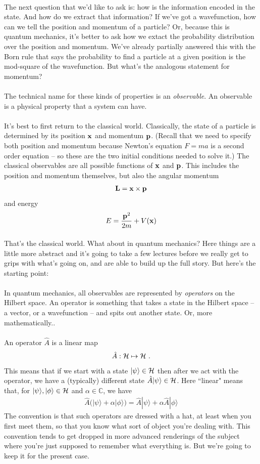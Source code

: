 \documentclass[12pt]{article}
\def\be{\begin{eqnarray}}
\def\ee{\end{eqnarray}}
\newcommand{\nn}{\nonumber}
\newcommand\para{\paragraph{}}
\newcommand{\ket}[1]{|#1\rangle}
\newcommand{\co}{\color{olive}}
\newcommand{\C}{{\mathds C}}
\newcommand{\bx}{{\bf x}}
\newcommand{\bp}{{\bf p}}
\begin{document}
{\para
The next question that we'd like to ask is: how is the information encoded in the state. And how do we extract that information? If we've got a wavefunction, how can we tell the position and momentum of a particle? Or, because this is quantum mechanics, it's better to ask how we extact the probability distribution over the position and momentum. We've already partially answered this with the Born rule that says the probability to find a particle at a given position is the mod-square of the wavefunction. But what's the analogous statement for momentum? 

\para
The technical name for these kinds of properties is an {\it observable}. An observable is a physical property that a system can have.

\para
It's best to first return to the classical world. {\co Classically, the state of a particle is determined by its position $\bx$ and momentum $\bp$.} (Recall that we need to specify both position and momentum because Newton's equation $F=ma$ is a second order equation -- so these are the two initial conditions needed to solve it.) {\co The classical observables are all possible functions of $\bx$ and $\bp$. This includes the position and momentum themselves, but also the angular momentum
%
\be {\bf L} = \bx\times \bp\nn\ee
%
and energy 
%
\be E = \frac{\bp^2}{2m} + V(\bx)\nn\ee
%
}

\para
That's the classical world. What about in quantum mechanics? Here things are a little more abstract and it's going to take a few lectures before we really get to grips with what's going on, and are able to build up the full story. But here's the starting point:

\para
{\co In quantum mechanics, all observables are represented by {\it operators} on the Hilbert space.} An operator is something that takes a state in the Hilbert space -- a vector, or a wavefunction -- and spits out another state. Or, more mathematically..

\para
{\co An operator $\hat{A}$ is a linear map
%
\be \hat{A}:{\cal H}\mapsto{\cal H} \ .\nn\ee
%
This means that if we start with a state $\ket{\psi}\in {\cal H}$ then after we act with the operator, we have a (typically) different state $\hat{A}\ket{\psi} \in {\cal H}$. Here ``linear" means that, for $\ket{\psi},\ket{\phi}\in {\cal H}$ and $\alpha\in\C$, we have
%
\be \hat{A}\big(\ket{\psi}+\alpha \ket{\phi}\big)=\hat{A}\ket{\psi} +\alpha\hat{A}\ket{\phi}\nn\ee
%
} The convention is that such operators are dressed with a hat, at least when you first meet them, so that you know what sort of  object you're dealing with. This convention tends to get dropped in more advanced renderings of the subject where you're just supposed to remember what everything is. But we're going to keep it for the present case.

}
\end{document}
